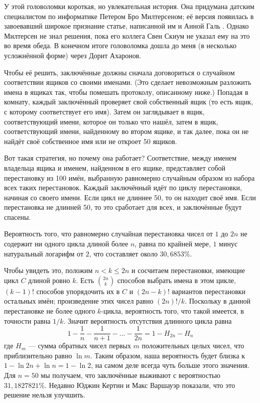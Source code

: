 У этой головоломки короткая, но увлекательная история.
Она придумана датским специалистом по информатике Петером Бро Милтерсеном;
её версия появилась в завоевавший широкое признание статье, написанной им и Анной Галь \cite{gal-miltersen}.
Однако Милтерсен не знал  решения, пока его коллега Свен Скиум не указал ему на это во время обеда.
В конечном итоге головоломка дошла до меня (в несколько усложнённой форме) через Дорит Ахаронов.

Чтобы её решить, заключённые должны сначала договориться о случайном соответствии ящиков со своими именами.
(Это сделает невозможным разложить имена в ящиках так, чтобы помешать протоколу, описанному ниже.)
Попадая в комнату, каждый заключённый проверяет свой собственный ящик (то есть ящик, с которому соответствует его имя).
Затем он заглядывает в ящик, соответствующий имени, которое он только что нашёл,
затем в ящик, соответствующий имени, найденному во втором ящике, и так далее, пока он не найдёт своё собственное имя или не откроет 50 ящиков.

Вот такая стратегия, но почему она работает?
Соответствие, между именем владельца ящика и именем, найденном в его ящике, представляет собой перестановку из 100 имён, выбранную равномерно случайным образом из набора всех таких перестановок.
Каждый заключённый идёт по циклу перестановки, начиная со своего имени.
Если цикл не длиннее 50, то он находит своё имя.
Если перестановка не длинней 50, то это сработает для всех, и заключённые будут спасены.

Вероятность того, что равномерно случайная перестановка чисел от $1$ до $2n$ не содержит ни одного цикла длиной более $n$, равна по крайней мере, $1$ минус натуральный логарифм от $2$, что составляет около $30,6853\%$.

Чтобы увидеть это, положим $n < k \le 2n$ и сосчитаем перестановки, имеющие цикл $C$ длиной ровно $k$.
Есть $\binom{2n}k$ способов выбрать имена в этом цикле, $(k - 1)!$ способов упорядочить их в $C$
и $(2n - k)!$ вариантов перестановки остальных имён;
произведение этих чисел равно $(2n)!/k$.
Поскольку в данной перестановке не более одного $k$-цикла, вероятность того, что такой имеется, в точности равна $1/k$.
Значит вероятность отсутствия длинного цикла равна
\[1-\frac{1}{n}-\frac{1}{n+1}-\dots-\frac{1}{2n}=1-H_{2n}-H_n\]
где $H_m$ --- сумма обратных чисел первых $m$ положительных целых чисел, что приблизительно равно $\ln m$.
Таким образом, наша вероятность будет близка к $1 - \ln 2n + \ln n = 1 - \ln 2$, на самом деле всегда чуть больше этого значения.
Для $n = 50$ мы получаем, что заключённые выживают с вероятностью $31,1827821\%$.
Недавно Юджин  Кертин и Макс Варшауэр \cite{curtin-warshaue} показали, что это решение нельзя улучшить.

